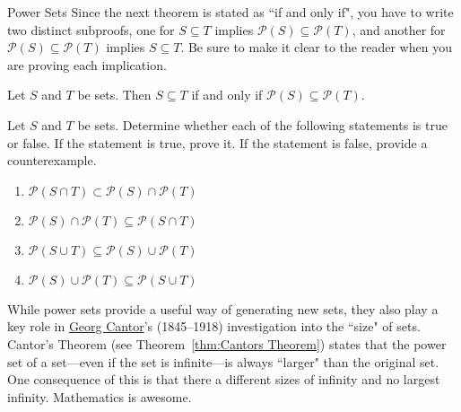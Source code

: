 \begin{section}{Power Sets}
Since the next theorem is stated as ``if and only if", you have to write two distinct subproofs, one for $S\subseteq T$ implies $\mathcal{P}(S)\subseteq \mathcal{P}(T)$, and another for $\mathcal{P}(S)\subseteq \mathcal{P}(T)$ implies $S\subseteq T$. Be sure to make it clear to the reader when you are proving each implication.

\begin{theorem}
Let $S$ and $T$ be sets.  Then $S\subseteq T$ if and only if $\mathcal{P}(S)\subseteq \mathcal{P}(T)$.
\end{theorem}

\begin{problem}
Let $S$ and $T$ be sets. Determine whether each of the following statements is true or false. If the statement is true, prove it. If the statement is false, provide a counterexample.
\begin{enumerate}[label=\textrm{(\alph*)}]
\item $\mathcal{P}(S\cap T) \subset \mathcal{P}(S)\cap\mathcal{P}(T)$
\item $\mathcal{P}(S)\cap\mathcal{P}(T)\subseteq \mathcal{P}(S\cap T)$
\item $\mathcal{P}(S\cup T)\subseteq \mathcal{P}(S)\cup\mathcal{P}(T)$
\item $\mathcal{P}(S)\cup\mathcal{P}(T)\subseteq \mathcal{P}(S\cup T)$
\end{enumerate}
\end{problem}

While power sets provide a useful way of generating new sets, they also play a key role in \href{https://en.wikipedia.org/wiki/Georg_Cantor}{Georg Cantor}'s (1845--1918) investigation into the ``size" of sets. Cantor's Theorem (see Theorem~\ref{thm:Cantors Theorem}) states that the power set of a set---even if the set is infinite---is always ``larger" than the original set. One consequence of this is that there a different sizes of infinity and no largest infinity. Mathematics is awesome.

\end{section}